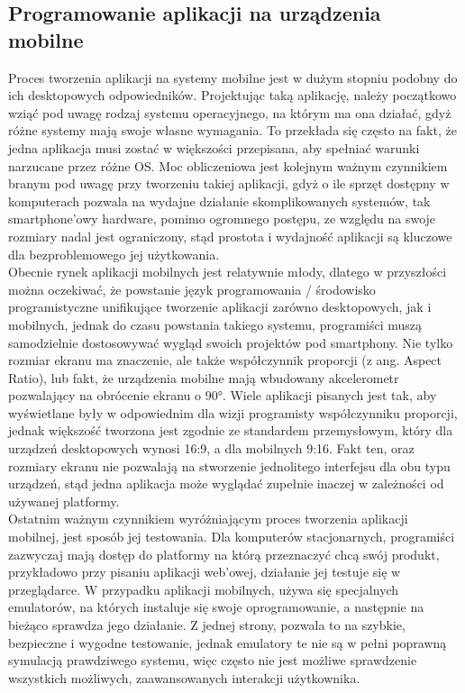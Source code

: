 \documentclass[12pt, a4paper]{article}
\begin{document}
\begin{sloppypar}
{  \subsection{Programowanie aplikacji na urządzenia mobilne}
  {
    Proces tworzenia aplikacji na systemy mobilne jest w dużym stopniu podobny do
    ich desktopowych odpowiedników. Projektując taką aplikację, należy początkowo wziąć
    pod uwagę rodzaj systemu operacyjnego, na którym ma ona działać, gdyż różne systemy
    mają swoje własne wymagania. To przekłada się często na fakt, że jedna aplikacja musi
    zostać w większości przepisana, aby spełniać warunki narzucane przez różne OS.
    Moc obliczeniowa jest kolejnym ważnym czynnikiem branym pod uwagę przy tworzeniu
    takiej aplikacji, gdyż o ile sprzęt dostępny w komputerach pozwala na wydajne
    działanie skomplikowanych systemów, tak smartphone'owy hardware, pomimo ogromnego
    postępu, ze względu na swoje rozmiary nadal jest ograniczony, stąd prostota i
    wydajność aplikacji są kluczowe dla bezproblemowego jej użytkowania.\\
    Obecnie rynek aplikacji mobilnych jest relatywnie młody, dlatego w przyszłości
    można oczekiwać, że powstanie język programowania / środowisko programistyczne
    unifikujące tworzenie aplikacji zarówno desktopowych, jak i mobilnych, jednak do
    czasu powstania takiego systemu, programiści muszą samodzielnie dostosowywać wygląd
    swoich projektów pod smartphony. Nie tylko rozmiar ekranu ma znaczenie, ale
    także współczynnik proporcji (z ang. Aspect Ratio), lub fakt, że urządzenia mobilne
    mają wbudowany akcelerometr pozwalający na obrócenie ekranu o \ang{90}. Wiele aplikacji
    pisanych jest tak, aby wyświetlane były w odpowiednim dla wizji programisty współczynniku
    proporcji, jednak większość tworzona jest zgodnie ze standardem przemysłowym,
    który dla urządzeń desktopowych wynosi 16:9, a dla mobilnych 9:16. Fakt ten, oraz
    rozmiary ekranu nie pozwalają na stworzenie jednolitego interfejsu dla obu typu
    urządzeń, stąd jedna aplikacja może wyglądać zupełnie inaczej w zależności od
    używanej platformy.\\
    Ostatnim ważnym czynnikiem wyróżniającym proces tworzenia aplikacji mobilnej, jest
    sposób jej testowania. Dla komputerów stacjonarnych, programiści zazwyczaj mają
    dostęp do platformy na którą przeznaczyć chcą swój produkt, przykładowo przy
    pisaniu aplikacji web'owej, działanie jej testuje się w przeglądarce. W przypadku
    aplikacji mobilnych, używa się specjalnych emulatorów, na których instaluje się
    swoje oprogramowanie, a następnie na bieżąco sprawdza jego działanie. Z jednej
    strony, pozwala to na szybkie, bezpieczne i wygodne testowanie, jednak emulatory te
    nie są w pełni poprawną symulacją prawdziwego systemu, więc często nie jest
    możliwe sprawdzenie wszystkich możliwych, zaawansowanych interakcji użytkownika.
  }
}
\end{sloppypar}
\end{document}
